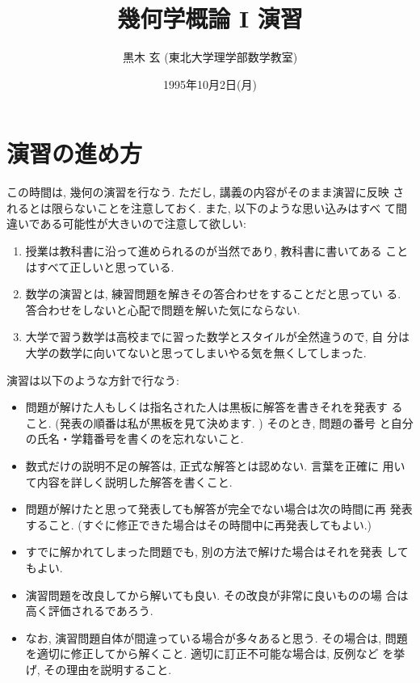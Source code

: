 \documentclass[12pt,twoside]{jarticle}
\begin{document}

\title{\bf 幾何学概論 I 演習}

\author{黒木 玄 \quad (東北大学理学部数学教室)}

\date{1995年10月2日(月)}

\maketitle


\section{演習の進め方}

この時間は, 幾何の演習を行なう. ただし, 講義の内容がそのまま演習に反映
されるとは限らないことを注意しておく. また, 以下のような思い込みはすべ
て間違いである可能性が大きいので注意して欲しい:

\begin{enumerate}
\item 授業は教科書に沿って進められるのが当然であり, 教科書に書いてある
  ことはすべて正しいと思っている. 
\item 数学の演習とは, 練習問題を解きその答合わせをすることだと思ってい
  る. 答合わせをしないと心配で問題を解いた気にならない. 
\item 大学で習う数学は高校までに習った数学とスタイルが全然違うので, 自
  分は大学の数学に向いてないと思ってしまいやる気を無くしてしまった. 
\end{enumerate}

演習は以下のような方針で行なう:

\begin{itemize}
\item 問題が解けた人もしくは指名された人は黒板に解答を書きそれを発表す
  ること.  (発表の順番は私が黒板を見て決めます. ) そのとき, 問題の番号
  と自分の氏名・学籍番号を書くのを忘れないこと.
\item 数式だけの説明不足の解答は, 正式な解答とは認めない. 言葉を正確に
  用いて内容を詳しく説明した解答を書くこと. 
\item 問題が解けたと思って発表しても解答が完全でない場合は次の時間に再
  発表すること.  (すぐに修正できた場合はその時間中に再発表してもよい.)
\item すでに解かれてしまった問題でも, 別の方法で解けた場合はそれを発表
  してもよい. 
\item 演習問題を改良してから解いても良い. その改良が非常に良いものの場
  合は高く評価されるであろう.
\item なお, 演習問題自体が間違っている場合が多々あると思う. その場合は, 
  問題を適切に修正してから解くこと. 適切に訂正不可能な場合は, 反例など
  を挙げ, その理由を説明すること.
\end{itemize}
\end{document}
